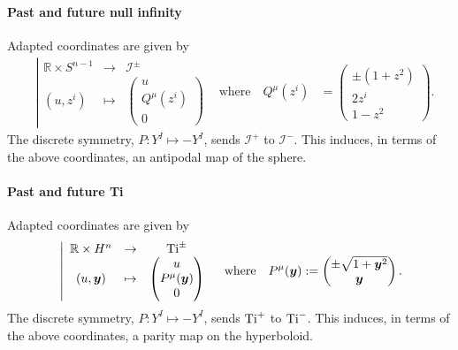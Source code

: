 \documentclass[a4paper, 10pt]{article}
\theoremstyle{remark}
\newcommand{\Ti}{\textnormal{Ti}}
\newcommand{\Scri}{\mathscr{I}}
\newcommand{\y}{\bm{y}}
\begin{document}
\paragraph{Past and future null infinity}

Adapted coordinates are given by
\begin{align}
    &\left|\begin{array}{ccc}
     \mathbb{R} \times S^{n-1}  & \to &  \Scri^{\pm}  \\
      (u , z^i)    & \mapsto & \begin{pmatrix}
           u \\ Q^{\mu}\left(z^i\right) \\ 0
      \end{pmatrix}
    \end{array}\right. & \text{where}\quad Q^{\mu}\left(z^i\right) &= \begin{pmatrix}
        \pm(1+ z^2) \\ 2 z^i \\ 1-z^2
    \end{pmatrix}.
\end{align}
The discrete symmetry, $P: Y^I \mapsto -Y^I$, sends $\mathscr{I}^{+}$ to $\mathscr{I}^{-}$. This induces, in terms of the above coordinates, an antipodal map of the sphere.

\paragraph{Past and future Ti}

Adapted coordinates are given by
\begin{align}
    &\left|\begin{array}{ccc}
     \mathbb{R} \times H^{n}  & \to &  \Ti^{\pm}  \\
      (u , \y )    & \mapsto & \begin{pmatrix}
           u \\ P^{\mu}(\y) \\ 0
      \end{pmatrix}
    \end{array}\right. & \text{where}\quad P^{\mu}(\y) :=  \begin{pmatrix}
        \pm\sqrt{1 + \y^2}\\ \y
    \end{pmatrix}. 
\end{align}
The discrete symmetry, $P :Y^I \mapsto -Y^I$, sends $\Ti^{+}$ to $\Ti^{-}$. This induces, in terms of the above coordinates, a parity map on the hyperboloid.
\end{document}
